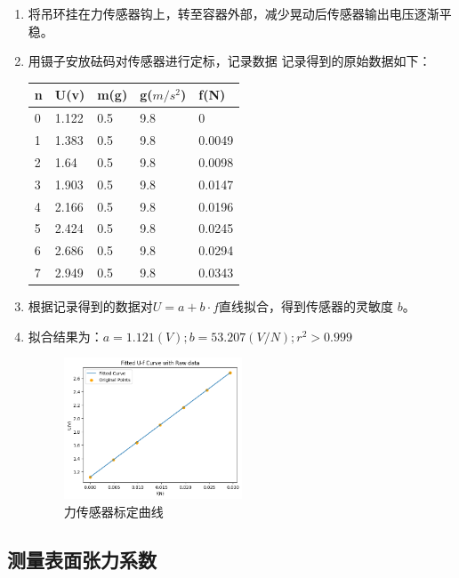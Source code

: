 \documentclass[UTF8]{ctexart}
\begin{document}
\begin{enumerate}
    \item 将吊环挂在力传感器钩上，转至容器外部，减少晃动后传感器输出电压逐渐平稳。
    \item 用镊子安放砝码对传感器进行定标，记录数据
    记录得到的原始数据如下：
    \\
    \begin{table}[H]
        \centering
\begin{tabular}{lllll}
\toprule
n&U(v)&m(g)&g($m/s^2$)&f(N)\\
\midrule
0&1.122&0.5&9.8&0\\
1&1.383&0.5&9.8&0.0049\\
2&1.64&0.5&9.8&0.0098\\
3&1.903&0.5&9.8&0.0147\\
4&2.166&0.5&9.8&0.0196\\
5&2.424&0.5&9.8&0.0245\\
6&2.686&0.5&9.8&0.0294\\
7&2.949&0.5&9.8&0.0343\\
\bottomrule
\end{tabular}
\end{table}

    \item 根据记录得到的数据对$U = a+b \cdot f$直线拟合，得到传感器的灵敏度 \(b\)。
    \item 拟合结果为：$a = 1.121(V);b = 53.207(V/N);r^2 > 0.999$
    
    \begin{figure}[htbp]
        \centering
        \includegraphics[width=0.5\textwidth]{picture1.png}
        \caption{力传感器标定曲线}
    \end{figure}

\end{enumerate}

\subsection{测量表面张力系数}
\end{document}
